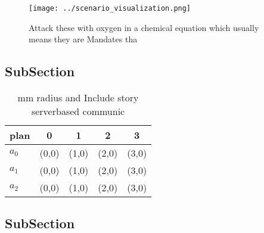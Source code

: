 \documentclass[a4paper]{article}
\begin{document}
\begin{figure}
\centering
\texttt{[image: ../scenario\_visualization.png]}
\caption{Attack these with oxygen in a chemical equation which usually means they are Mandates tha
}
\end{figure}
 
\subsection{SubSection}

\begin{table}
\begin{adjustbox}{width=0.6\columnwidth}
\begin{tabular}{|l|l|l|l|l|}
\hline
\textbf{plan} & \multicolumn{1}{c|}{\textbf{0}} & \multicolumn{1}{c|}{\textbf{1}} & \multicolumn{1}{c|}{\textbf{2}} & \multicolumn{1}{c|}{\textbf{3}} \\ \hline
\textbf{$a_0$}  & (0,0) & (1,0) & (2,0) & (3,0) \\ \hline
\textbf{$a_1$}  & (0,0) & (1,0) & (2,0) & (3,0) \\ \hline
\textbf{$a_2$}  & (0,0) & (1,0) & (2,0) & (3,0) \\ \hline
\end{tabular}
\end{adjustbox}
\caption{ mm radius and Include story serverbased communic
}
\end{table}

\subsection{SubSection}
\end{document}
